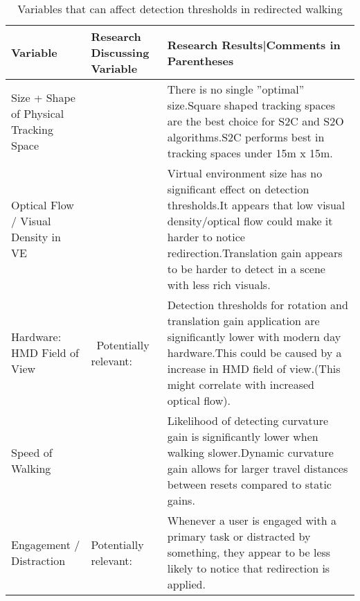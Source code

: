 \begin{table}[h!]
\centering
\begin{tabularx}{\textwidth}{|m{2cm}|m{1.7cm}|m{10.1cm}|} 
\hline
Variable & Research Discussing Variable & Research Results|Comments in Parentheses\\
\hline
Size + Shape of Physical Tracking Space & 
\cite{azmandian2015physical} & 
There is no single ''optimal'' size.\newline Square shaped tracking spaces are the best choice for S2C and S2O algorithms.\newline S2C performs best in tracking spaces under 15m x 15m.\\
\hline
Optical Flow / Visual Density in VE & ~\cite{8446225, steinicke2008moving, 8446216} & Virtual environment size has no significant effect on detection thresholds.\newline It appears that low visual density/optical flow could make it harder to notice redirection.\newline Translation gain appears to be harder to detect in a scene with less rich visuals.\\
\hline
Hardware: HMD Field of View &
~\cite{fuglestad2018redirected}\newline Potentially relevant:\newline\cite{norouzi2018assessing} &
Detection thresholds for rotation and translation gain application are significantly lower with modern day hardware.\newline This could be caused by a increase in HMD field of view.\newline(This might correlate with increased optical flow).\\
\hline
Speed of Walking & \cite{5759454} & Likelihood of detecting curvature gain is significantly lower when walking slower.\newline Dynamic curvature gain allows for larger travel distances between resets compared to static gains.\\
\hline
Engagement / Distraction & \cite{5072212, schmitz2018you, sra2018vmotion}\newline Potentially relevant:\newline\cite{norouzi2018assessing, 5759454} & Whenever a user is engaged with a primary task or distracted by something, they appear to be less likely to notice that redirection is applied.\\
\hline
\end{tabularx}
\caption{Variables that can affect detection thresholds in redirected walking}
\label{table:DTVariables}
\end{table}

